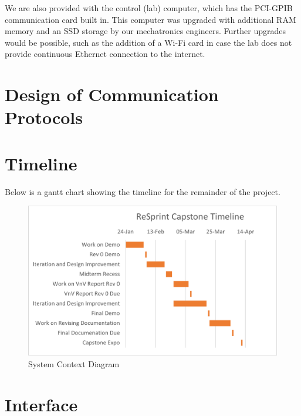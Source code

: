 \documentclass[12pt, titlepage]{article}
\begin{document}
\noindent We are also provided with the control (lab) computer, which has the PCI-GPIB communication card built in. This computer was upgraded with additional RAM memory and an SSD storage by our mechatronics engineers. Further upgrades would be possible, such as the addition of a Wi-Fi card in case the lab does not provide continuous Ethernet connection to the internet. \\

\section{Design of Communication Protocols}


\section{Timeline}

Below is a gantt chart showing the timeline for the remainder of the project.

\begin{figure}[H]
\centerline{\includegraphics[scale=1]{gantt.png}}
\caption{System Context Diagram}
\label{fig}
\end{figure}


% 

\newpage{}

\appendix

\section{Interface}
\end{document}
